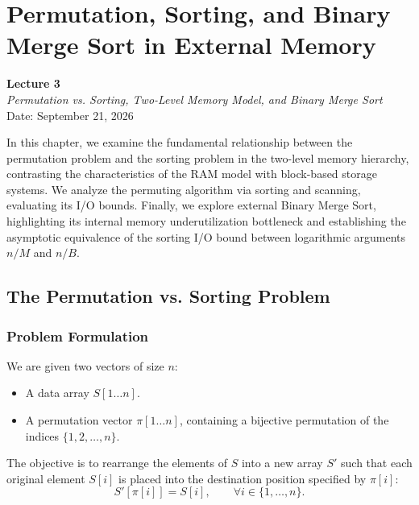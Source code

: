 \chapter{Permutation, Sorting, and Binary Merge Sort in External Memory}
\label{cha:lecture-three}

\begin{center}
  \textbf{Lecture 3}\\
  \emph{Permutation vs. Sorting, Two-Level Memory Model, and Binary Merge Sort}\\[0.5em]
  Date: September 21, 2026
\end{center}

In this chapter, we examine the fundamental relationship between the permutation problem and the sorting problem in the two-level memory hierarchy, contrasting the characteristics of the RAM model with block-based storage systems. We analyze the permuting algorithm via sorting and scanning, evaluating its I/O bounds. Finally, we explore external Binary Merge Sort, highlighting its internal memory underutilization bottleneck and establishing the asymptotic equivalence of the sorting I/O bound between logarithmic arguments $n/M$ and $n/B$.

\section{The Permutation vs. Sorting Problem}
\label{sec:permutation-vs-sorting}

\subsection{Problem Formulation}
\label{subsec:problem-formulation}

We are given two vectors of size $n$:
\begin{itemize}
  \item A data array $S[1 \dots n]$.
  \item A permutation vector $\pi[1 \dots n]$, containing a bijective permutation of the indices $\{1, 2, \dots, n\}$.
\end{itemize}

The objective is to rearrange the elements of $S$ into a new array $S'$ such that each original element $S[i]$ is placed into the destination position specified by $\pi[i]$:
\begin{equation}
  S'[\pi[i]] = S[i], \qquad \forall i \in \{1, \dots, n\}.
\end{equation}

